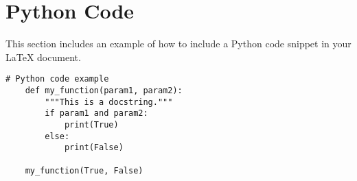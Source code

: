 \section{Python Code}
\label{sec:python_code}

This section includes an example of how to include a Python code snippet in your LaTeX document.

\begin{lstlisting}[caption=Python example, label=lst:python_code]
    # Python code example
    def my_function(param1, param2):
        """This is a docstring."""
        if param1 and param2:
            print(True)
        else:
            print(False)
    
    my_function(True, False)
\end{lstlisting}